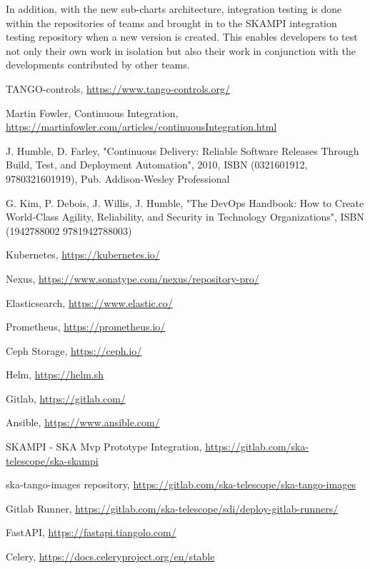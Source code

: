 \documentclass[a4paper,
               keeplastbox,   %
               ]{jacow}
\begin{document}
In addition, with the new sub-charts architecture, integration testing is done within the repositories of teams and brought in to the SKAMPI integration testing repository when a new version is created.  This enables developers to test not only their own work in isolation but also their work in conjunction with the developments contributed by other teams.

%
	{\printbibliography}%
	{%
	
	\begin{thebibliography}{99} %
	
		TANGO-controls,
		\url{https://www.tango-controls.org/}
	
		Martin Fowler, Continuous Integration,
		\url{https://martinfowler.com/articles/continuousIntegration.html}
		
	    J. Humble, D. Farley, "Continuous Delivery: Reliable Software Releases Through Build, Test, and Deployment Automation",
	    2010, ISBN (0321601912, 9780321601919), Pub. Addison-Wesley Professional
	
	    G. Kim, P. Debois, J. Willis, J. Humble, "The DevOps Handbook: How to Create World-Class Agility, Reliability, and Security in Technology Organizations", ISBN (1942788002 9781942788003)

		Kubernetes,
		\url{https://kubernetes.io/}

		Nexus,
		\url{https://www.sonatype.com/nexus/repository-pro/}

		Elasticsearch,
		\url{https://www.elastic.co/}

		Prometheus,
		\url{https://prometheus.io/}

		Ceph Storage,
		\url{https://ceph.io/}

		Helm,
		\url{https://helm.sh}

		Gitlab,
		\url{https://gitlab.com/}

		Ansible,
		\url{https://www.ansible.com/}

		SKAMPI - SKA Mvp Prototype Integration,
		\url{https://gitlab.com/ska-telescope/ska-skampi}

		ska-tango-images repository,
		\url{https://gitlab.com/ska-telescope/ska-tango-images}

		Gitlab Runner,
		\url{https://gitlab.com/ska-telescope/sdi/deploy-gitlab-runners/}
		
		FastAPI,
		\url{https://fastapi.tiangolo.com/}
	
		Celery,
		\url{https://docs.celeryproject.org/en/stable}


	\end{thebibliography}
}
 
\end{document}
